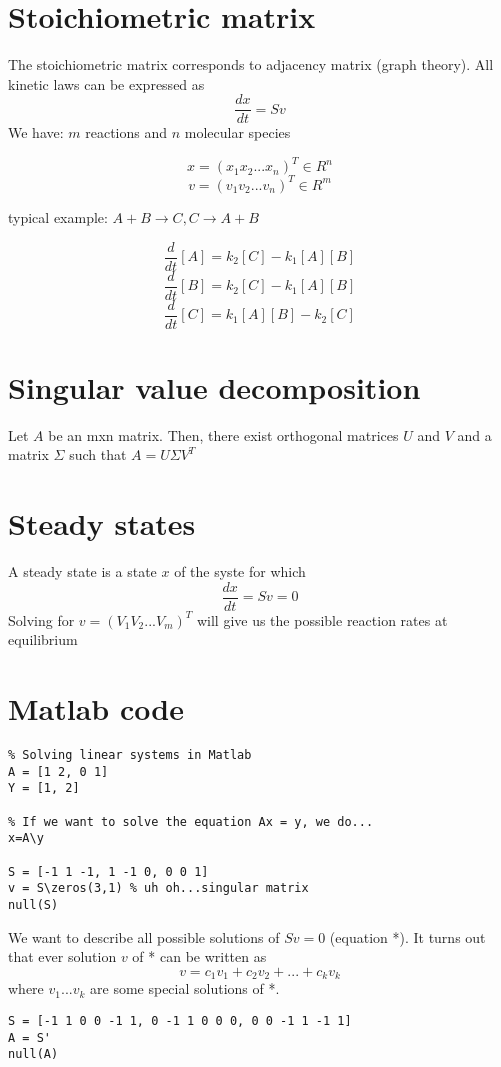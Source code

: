 \documentclass[10pt]{article}
\begin{document}
\section*{Stoichiometric matrix}

The stoichiometric matrix corresponds to adjacency matrix (graph theory). All kinetic laws can be expressed as \[ \frac{dx}{dt} = Sv \]
We have: $m$ reactions and $n$ molecular species

\[ x = (x_1 x_2 ... x_n)^T \in R^n \]
\[ v = (v_1 v_2 ... v_n)^T \in R^m \]

typical example: $A + B \rightarrow C, C \rightarrow A + B$

\[ \frac{d}{dt}[A] = k_2[C] - k_1[A][B] \]
\[ \frac{d}{dt}[B] = k_2[C] - k_1[A][B] \]
\[ \frac{d}{dt}[C] = k_1[A][B] - k_2[C] \]


\section*{Singular value decomposition}
Let $A$ be an mxn matrix.
Then, there exist orthogonal matrices $U$ and $V$ and a matrix $\Sigma$ such that $A = U \Sigma V^T$

\section*{Steady states}
A steady state is a state $x$ of the syste for which \[ \frac{dx}{dt} = S v = 0 \]
Solving for $v = (V_1 V_2 ... V_m)^T$ will give us the possible reaction rates at equilibrium

\section*{Matlab code}
\begin{verbatim}
% Solving linear systems in Matlab
A = [1 2, 0 1]
Y = [1, 2]

% If we want to solve the equation Ax = y, we do...
x=A\y

S = [-1 1 -1, 1 -1 0, 0 0 1]
v = S\zeros(3,1) % uh oh...singular matrix
null(S)
\end{verbatim}

We want to describe all possible solutions of $S v = 0$ (equation *). It turns out that ever solution $v$ of * can be written as \[ v = c_1 v_1 + c_2 v_2 + ... + c_k v_k \]
where $v_1 ... v_k$ are some special solutions of *.

\begin{verbatim}
S = [-1 1 0 0 -1 1, 0 -1 1 0 0 0, 0 0 -1 1 -1 1]
A = S'
null(A)
\end{verbatim}
\end{document}
